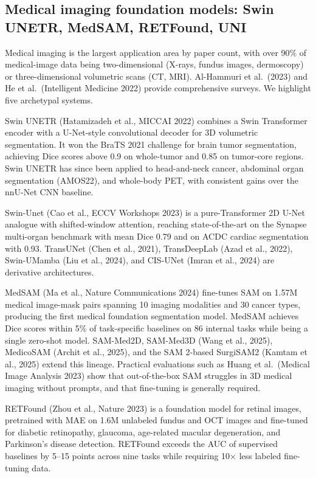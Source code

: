 \subsection{Medical imaging foundation models: Swin UNETR, MedSAM, RETFound, UNI}\label{medical-imaging-foundation-models-swin-unetr-medsam-retfound-uni}

Medical imaging is the largest application area by paper count, with over 90\% of medical-image data being two-dimensional (X-rays, fundus images, dermoscopy) or three-dimensional volumetric scans (CT, MRI). Al-Hammuri et al.~(2023) and He et al.~(Intelligent Medicine 2022) provide comprehensive surveys. We highlight five archetypal systems.

Swin UNETR (Hatamizadeh et al., MICCAI 2022) combines a Swin Transformer encoder with a U-Net-style convolutional decoder for 3D volumetric segmentation. It won the BraTS 2021 challenge for brain tumor segmentation, achieving Dice scores above 0.9 on whole-tumor and 0.85 on tumor-core regions. Swin UNETR has since been applied to head-and-neck cancer, abdominal organ segmentation (AMOS22), and whole-body PET, with consistent gains over the nnU-Net CNN baseline.

Swin-Unet (Cao et al., ECCV Workshops 2023) is a pure-Transformer 2D U-Net analogue with shifted-window attention, reaching state-of-the-art on the Synapse multi-organ benchmark with mean Dice 0.79 and on ACDC cardiac segmentation with 0.93. TransUNet (Chen et al., 2021), TransDeepLab (Azad et al., 2022), Swin-UMamba (Liu et al., 2024), and CIS-UNet (Imran et al., 2024) are derivative architectures.

MedSAM (Ma et al., Nature Communications 2024) fine-tunes SAM on 1.57M medical image-mask pairs spanning 10 imaging modalities and 30 cancer types, producing the first medical foundation segmentation model. MedSAM achieves Dice scores within 5\% of task-specific baselines on 86 internal tasks while being a single zero-shot model. SAM-Med2D, SAM-Med3D (Wang et al., 2025), MedicoSAM (Archit et al., 2025), and the SAM 2-based SurgiSAM2 (Kamtam et al., 2025) extend this lineage. Practical evaluations such as Huang et al.~(Medical Image Analysis 2023) show that out-of-the-box SAM struggles in 3D medical imaging without prompts, and that fine-tuning is generally required.

RETFound (Zhou et al., Nature 2023) is a foundation model for retinal images, pretrained with MAE on 1.6M unlabeled fundus and OCT images and fine-tuned for diabetic retinopathy, glaucoma, age-related macular degeneration, and Parkinson's disease detection. RETFound exceeds the AUC of supervised baselines by 5--15 points across nine tasks while requiring 10× less labeled fine-tuning data.

